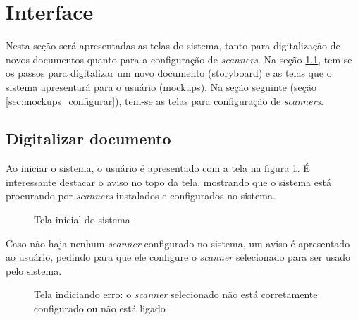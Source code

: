 \section{Interface}
\label{sec:mockups}

Nesta seção será apresentadas as telas do sistema, tanto para digitalização de novos documentos quanto para a configuração de {\it scanners}. Na seção \ref{sec:mockups_digitalizar}, tem-se os passos para digitalizar um novo documento (storyboard) e as telas que o sistema apresentará para o usuário (mockups). Na seção seguinte (seção \ref{sec:mockups_configurar}), tem-se as telas para configuração de {\it scanners}.

\subsection{Digitalizar documento}
\label{sec:mockups_digitalizar}

Ao iniciar o sistema, o usuário é apresentado com a tela na figura \ref{fig:dig_1}. É interessante destacar o aviso no topo da tela, mostrando que o sistema está procurando por {\it scanners} instalados e configurados no sistema.

\begin{figure}[h]
 \centering
    \setlength\fboxsep{0pt}
    \setlength\fboxrule{0.5pt}
  \caption {Tela inicial do sistema}
  \label{fig:dig_1}
\end{figure}

Caso não haja nenhum {\it scanner} configurado no sistema, um aviso é apresentado ao usuário, pedindo para que ele configure o {\it scanner} selecionado para ser usado pelo sistema.

\begin{figure}[h]
 \centering
    \setlength\fboxsep{0pt}
    \setlength\fboxrule{0.5pt}
  \caption {Tela indiciando erro: o {\it scanner} selecionado não está corretamente configurado ou não está ligado}
  \label{fig:dig_2}
\end{figure}


